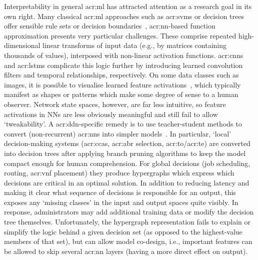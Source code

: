 Interpretability in general \gls{acr:ml} has attracted attention as a research goal in its own right.
Many classical \gls{acr:ml} approaches such as \glspl{acr:svm} or decision trees offer sensible rule sets or decision boundaries~\parencite{DBLP:conf/pkdd/MolnarCB20,interpretable-ml}, \gls{acr:nn}-based function approximation presents very particular challenges.
These comprise repeated high-dimensional linear transforms of input data (e.g., by matrices containing thousands of values), interposed with non-linear activation functions.
\glspl{acr:cnn} and \glspl{acr:lstm} complicate this logic further by introducing learned convolution filters and temporal relationships, respectively.
On some data classes such as images, it is possible to visualise learned feature activations~\parencite{cnn-features-distil}, which typically manifest as shapes or patterns which make some degree of sense to a human observer.
Network state spaces, however, are far less intuitive, so feature activations in NNs are less obviously meaningful and still fail to allow `tweakability'.
A \gls{acr:ddn}-specific remedy is to use teacher-student methods to convert (non-recurrent) \glspl{acr:nn} into simpler models~\parencite{DBLP:conf/sigcomm/MengWBXMH20}.
In particular, `local' decision-making systems (\glspl{acr:cca}, \gls{acr:abr} selection, \gls{acr:to}/\gls{acr:te}) are converted into decision trees after applying branch pruning algorithms to keep the model compact enough for human comprehension.
For global decisions (job scheduling, routing, \gls{acr:vnf} placement) they produce hypergraphs which express which decisions are critical in an optimal solution.
In addition to reducing latency and making it clear what sequence of decisions is responsible for an output, this exposes any `missing classes' in the input and output spaces quite visibly.
In response, administrators may add additional training data or modify the decision tree themselves.
Unfortunately, the hypergraph representation fails to explain or simplify the logic behind a given decision set (as opposed to the highest-value members of that set), but can allow model co-design, i.e., important features can be allowed to skip several \gls{acr:nn} layers (having a more direct effect on output).

